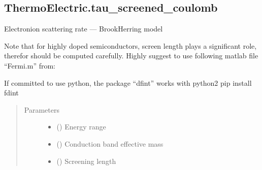 \documentclass[letterpaper,10pt,english]{sphinxmanual}
\begin{document}
\subsection{ThermoElectric.tau\_screened\_coulomb}
\label{\detokenize{autosummary/ThermoElectric.tau_screened_coulomb:thermoelectric-tau-screened-coulomb}}\label{\detokenize{autosummary/ThermoElectric.tau_screened_coulomb::doc}}

\begin{fulllineitems}
\label{\detokenize{autosummary/ThermoElectric.tau_screened_coulomb:ThermoElectric.tau_screened_coulomb}}
\sphinxAtStartPar
Electron\sphinxhyphen{}ion scattering rate — Brook\sphinxhyphen{}Herring model

\sphinxAtStartPar
Note that for highly doped semiconductors, screen length plays a significant role,
therefor should be computed carefully. Highly suggest to use following matlab file “Fermi.m”
from: 

\sphinxAtStartPar
If committed to use python, the package “dfint” works with python2
pip install fdint
\begin{quote}\begin{description}
\item[{Parameters}] \leavevmode\begin{itemize}
\item {} 
\sphinxAtStartPar
{} () \textendash{} Energy range

\item {} 
\sphinxAtStartPar
{} () \textendash{} Conduction band effective mass

\item {} 
\sphinxAtStartPar
{} () \textendash{} Screening length


\end{itemize}
\end{description}
\end{quote}
\end{fulllineitems}
\end{document}
